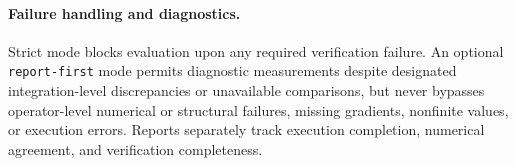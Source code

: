 \paragraph{Failure handling and diagnostics.}
Strict mode blocks evaluation upon any required verification
failure. An optional \texttt{report-first} mode permits
diagnostic measurements despite designated integration-level
discrepancies or unavailable comparisons, but never bypasses
operator-level numerical or structural failures, missing
gradients, nonfinite values, or execution errors. Reports
separately track execution completion, numerical agreement,
and verification completeness.









